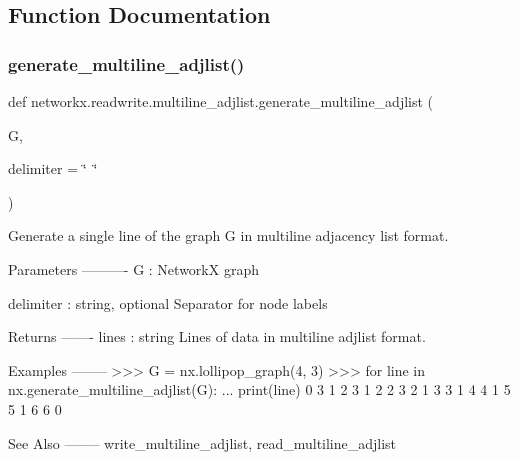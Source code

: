 \subsection{Function Documentation}
\mbox{\label{namespacenetworkx_1_1readwrite_1_1multiline__adjlist_a83fcdce846ddc885e89c46af2f4a645c}} 
\subsubsection{\texorpdfstring{generate\+\_\+multiline\+\_\+adjlist()}{generate\_multiline\_adjlist()}}
{\footnotesize\ttfamily def networkx.\+readwrite.\+multiline\+\_\+adjlist.\+generate\+\_\+multiline\+\_\+adjlist (\begin{DoxyParamCaption}\item[{}]{G,  }\item[{}]{delimiter = {\ttfamily \char`\"{}~\char`\"{}} }\end{DoxyParamCaption})}

\begin{DoxyVerb}Generate a single line of the graph G in multiline adjacency list format.

Parameters
----------
G : NetworkX graph

delimiter : string, optional
   Separator for node labels

Returns
-------
lines : string
    Lines of data in multiline adjlist format.

Examples
--------
>>> G = nx.lollipop_graph(4, 3)
>>> for line in nx.generate_multiline_adjlist(G):
...     print(line)
0 3
1 {}
2 {}
3 {}
1 2
2 {}
3 {}
2 1
3 {}
3 1
4 {}
4 1
5 {}
5 1
6 {}
6 0

See Also
--------
write_multiline_adjlist, read_multiline_adjlist
\end{DoxyVerb}
 \mbox{\label{namespacenetworkx_1_1readwrite_1_1multiline__adjlist_a6e7ce7a95b86a569d5851d976a6e7f12}} 
